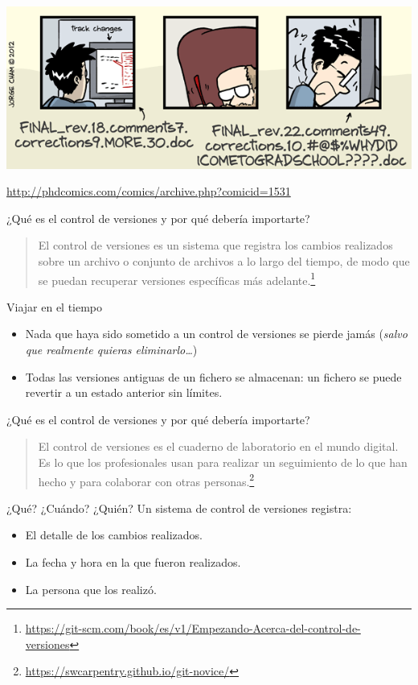 \documentclass[xcolor={usenames,svgnames,dvipsnames}]{beamer}
\begin{document}
\begin{frame}[label={sec:org75e6e3c},plain]{}
\begin{center}
\includegraphics[width=0.9\paperwidth]{figs/phdcomic_finaldoc_3.png}
\end{center}

\url{http://phdcomics.com/comics/archive.php?comicid=1531}
\end{frame}

\begin{frame}[label={sec:orgfa94d77}]{¿Qué es el control de versiones y por qué debería importarte?}
\begin{quote}
El control de versiones es un sistema que \alert{registra los cambios}
realizados sobre un archivo o conjunto de archivos a lo largo del
tiempo, de modo que se puedan \alert{recuperar} versiones específicas más
adelante.\footnote{\url{https://git-scm.com/book/es/v1/Empezando-Acerca-del-control-de-versiones}}
\end{quote}
\begin{block}{Viajar en el tiempo}
\begin{itemize}
\item Nada que haya sido sometido a un control de versiones se pierde jamás (\emph{salvo que realmente quieras eliminarlo\ldots{}})
\item \alert{Todas} las versiones antiguas de un fichero se almacenan: un fichero se puede revertir a un estado anterior sin límites.
\end{itemize}
\end{block}
\end{frame}
\begin{frame}[label={sec:org6eb7963}]{¿Qué es el control de versiones y por qué debería importarte?}
\begin{quote}
El control de versiones es el \alert{cuaderno de laboratorio} en el mundo digital. Es lo que los profesionales usan para realizar un
\alert{seguimiento} de lo que han hecho y para \alert{colaborar} con otras
personas.\footnote{\url{https://swcarpentry.github.io/git-novice/}\label{org6c5bd59}}
\end{quote}


\begin{block}{¿Qué? ¿Cuándo? ¿Quién?}
Un sistema de control de versiones registra:
\begin{itemize}
\item El detalle de los cambios realizados.
\item La fecha y hora en la que fueron realizados.
\item La persona que los realizó.
\end{itemize}
\end{block}
\end{frame}
\end{document}
